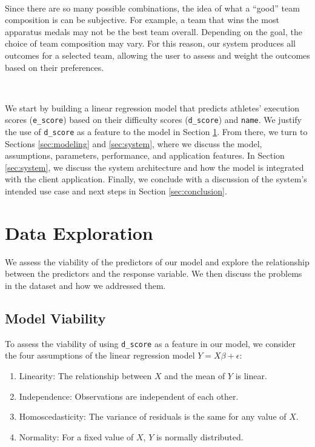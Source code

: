 \documentclass{article}
\begin{document}
\

\noindent Since there are so many possible combinations, the idea of what a 
``good'' team composition is can be subjective. For example, a team that 
wins the most apparatus medals may not be the best team overall. Depending on 
the goal, the choice of team composition may vary. For this reason, our system
produces all outcomes for a selected team, allowing the user to assess and weight 
the outcomes based on their preferences.


\

\noindent We start by building a linear regression model that predicts athletes' execution scores 
(\texttt{e\_score}) based on their difficulty scores (\texttt{d\_score}) and \texttt{name}. 
We justify the use of \texttt{d\_score} as a feature to the model 
in Section \ref{sec:eda}. From there, we turn to Sections \ref{sec:modeling} and \ref{sec:system},
where we discuss the model, assumptions, parameters, performance, and application features. In Section 
\ref{sec:system}, we discuss the system architecture and how the model is integrated with the client application. 
Finally, we conclude with a discussion of the system's intended use case and 
next steps in Section \ref{sec:conclusion}. 

\section{Data Exploration}\label{sec:eda}
We assess the viability of the predictors of our model and explore the 
relationship between the predictors and the response variable. We then 
discuss the problems in the dataset and how we addressed them.

\subsection{Model Viability}
To assess the viability of using \texttt{d\_score} as a feature in our model, we
consider the four assumptions of the linear regression model $Y = X\beta + \epsilon$:
\begin{enumerate}
    \item Linearity: The relationship between $X$ and the mean of $Y$ is linear.
    \item Independence: Observations are independent of each other.
    \item Homoscedasticity: The variance of residuals is the same for any value of $X$.
    \item Normality: For a fixed value of $X$, $Y$ is normally distributed.
\end{enumerate}
\end{document}

